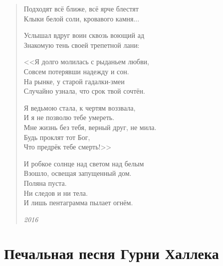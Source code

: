 \begin{verse}
Подходят всё ближе, всё ярче блестят\\
Клыки белой соли, кровавого камня...

Услышал вдруг воин сквозь воющий ад\\
Знакомую тень своей трепетной лани:

<<Я долго молилась с рыданьем любви,\\
Совсем потерявши надежду и сон.\\
На рынке, у старой гадалки-змеи\\
Случайно узнала, что срок твой сочтён.

Я ведьмою стала, к чертям воззвала,\\
И я не позволю тебе умереть.\\
Мне жизнь без тебя, верный друг, не мила.\\
Будь проклят тот Бог,\\
Что предрёк тебе смерть!>>

И робкое солнце над светом над белым\\
Взошло, освещая запущенный дом.\\
Поляна пуста.\\
Ни следов и ни тела.\\
И лишь пентаграмма пылает огнём.

\emph{2016}
\end{verse}
\newpage

\section{Печальная песня Гурни Халлека}

